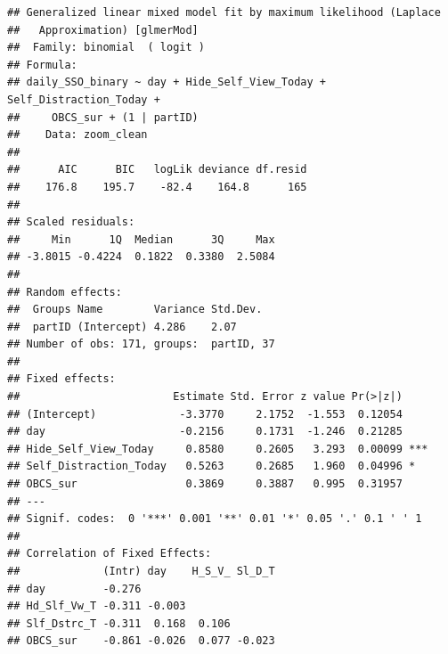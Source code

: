 \documentclass[
  english,
  man]{apa7}
\begin{document}
\begin{verbatim}
## Generalized linear mixed model fit by maximum likelihood (Laplace
##   Approximation) [glmerMod]
##  Family: binomial  ( logit )
## Formula: 
## daily_SSO_binary ~ day + Hide_Self_View_Today + Self_Distraction_Today +  
##     OBCS_sur + (1 | partID)
##    Data: zoom_clean
## 
##      AIC      BIC   logLik deviance df.resid 
##    176.8    195.7    -82.4    164.8      165 
## 
## Scaled residuals: 
##     Min      1Q  Median      3Q     Max 
## -3.8015 -0.4224  0.1822  0.3380  2.5084 
## 
## Random effects:
##  Groups Name        Variance Std.Dev.
##  partID (Intercept) 4.286    2.07    
## Number of obs: 171, groups:  partID, 37
## 
## Fixed effects:
##                        Estimate Std. Error z value Pr(>|z|)    
## (Intercept)             -3.3770     2.1752  -1.553  0.12054    
## day                     -0.2156     0.1731  -1.246  0.21285    
## Hide_Self_View_Today     0.8580     0.2605   3.293  0.00099 ***
## Self_Distraction_Today   0.5263     0.2685   1.960  0.04996 *  
## OBCS_sur                 0.3869     0.3887   0.995  0.31957    
## ---
## Signif. codes:  0 '***' 0.001 '**' 0.01 '*' 0.05 '.' 0.1 ' ' 1
## 
## Correlation of Fixed Effects:
##             (Intr) day    H_S_V_ Sl_D_T
## day         -0.276                     
## Hd_Slf_Vw_T -0.311 -0.003              
## Slf_Dstrc_T -0.311  0.168  0.106       
## OBCS_sur    -0.861 -0.026  0.077 -0.023
\end{verbatim}
\end{document}
